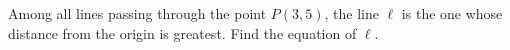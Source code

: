 Among all lines passing through the point $P(3,5)$, the line $\ell$ is the one whose distance from the origin is greatest. Find the equation of $\ell$.
